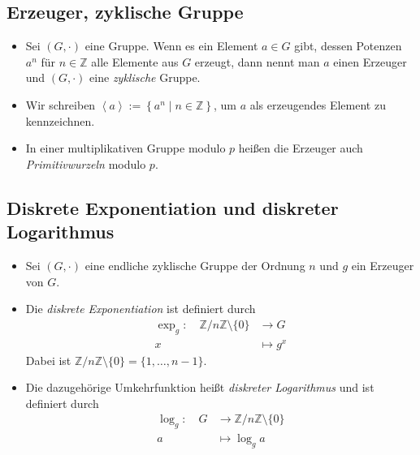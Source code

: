 \documentclass[utf8]{beamer}
\newcommand{\Z}{\mathbb{Z}}
\begin{document}
\subsection{Erzeuger, zyklische Gruppe}
\label{sub:erzeuger_zyklische_gruppe}

\begin{frame}{\insertsubsectionhead}
  \begin{itemize}
    \item Sei $(G, \cdot)$ eine Gruppe. Wenn es ein Element $a \in G$ gibt,
      dessen Potenzen $a^n$ für $n \in \Z$ alle Elemente aus $G$ erzeugt, dann
      nennt man $a$ einen Erzeuger und $(G, \cdot)$ eine \emph{zyklische}
      Gruppe.

    \item Wir schreiben $\left\langle a \right\rangle := \left\{ a^n \mid n \in
      \Z \right\}$, um $a$ als erzeugendes Element zu kennzeichnen.

    \item In einer multiplikativen Gruppe modulo $p$ heißen die Erzeuger auch
      \emph{Primitivwurzeln} modulo $p$.
  \end{itemize}
\end{frame}

\subsection{Diskrete Exponentiation und diskreter Logarithmus}
\label{sub:diskrete_exponentiation}

\begin{frame}{\insertsubsectionhead}
  \begin{itemize}
    \item Sei $(G, \cdot)$ eine endliche zyklische Gruppe der Ordnung $n$ und
      $g$ ein Erzeuger von $G$.
    \item Die \emph{diskrete Exponentiation} ist definiert durch
      \begin{align*}
        \exp_g: \quad \Z/n\Z \setminus \{ 0 \} & \to G\\
        x & \mapsto g^x
      \end{align*}
      Dabei ist $\Z/n\Z \setminus \{ 0 \} = \{1, \dots, n-1\}$.
    \item Die dazugehörige Umkehrfunktion heißt \emph{diskreter Logarithmus} und
      ist definiert durch
      \begin{align*}
        \log_g: \quad G & \to \Z/n\Z \setminus \{ 0 \}\\
        a & \mapsto \log_g a
      \end{align*}
  \end{itemize}
\end{frame}
\end{document}
